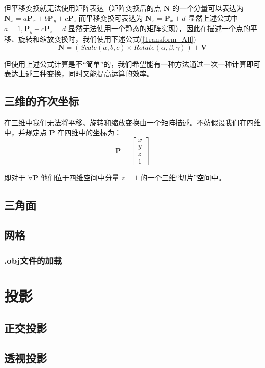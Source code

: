 \documentclass[12pt,oneside,a4paper]{ctexart}
\begin{document}
但平移变换就无法使用矩阵表达（矩阵变换后的点 $\mathbf{N}$ 的一个分量可以表达为 $\mathbf{N}_x=a\mathbf{P}_x+b\mathbf{P}_y+c\mathbf{P}_z$ 而平移变换可表达为 $\mathbf{N}_x=\mathbf{P}_x+d$ 显然上述公式中 $a=1, \mathbf{P}_y+c\mathbf{P}_z=d$ 显然无法使用一个静态的矩阵实现），因此在描述一个点的平移、旋转和缩放变换时，我们使用下述公式(\ref{Transform_All})
\begin{equation}
	\mathbf{N}=
	(
	Scale(a,b,c)
	\times
	Rotate(\alpha,\beta,\gamma)
	)
	+
	\mathbf{V}
	\label{Transform_All}
\end{equation}

但使用上述公式计算是不“简单”的，我们希望能有一种方法通过一次一种计算即可表达上述三种变换，同时又能提高运算的效率。
\subsection{三维的齐次坐标}
在三维中我们无法将平移、旋转和缩放变换由一个矩阵描述。不妨假设我们在四维中，并规定点 $\mathbf{P}$ 在四维中的坐标为：
\begin{equation*}
	\mathbf{P}=
	\begin{bmatrix}
		x \\
		y \\
		z \\
		1
	\end{bmatrix}
\end{equation*}

即对于 $\forall{}\mathbf{P}$ 他们位于四维空间中分量 $z=1$ 的一个三维“切片”空间中。
\subsection{三角面}
\subsection{网格}
\subsubsection{.obj文件的加载}
\section{投影}
\subsection{正交投影}
\subsection{透视投影}
\end{document}
